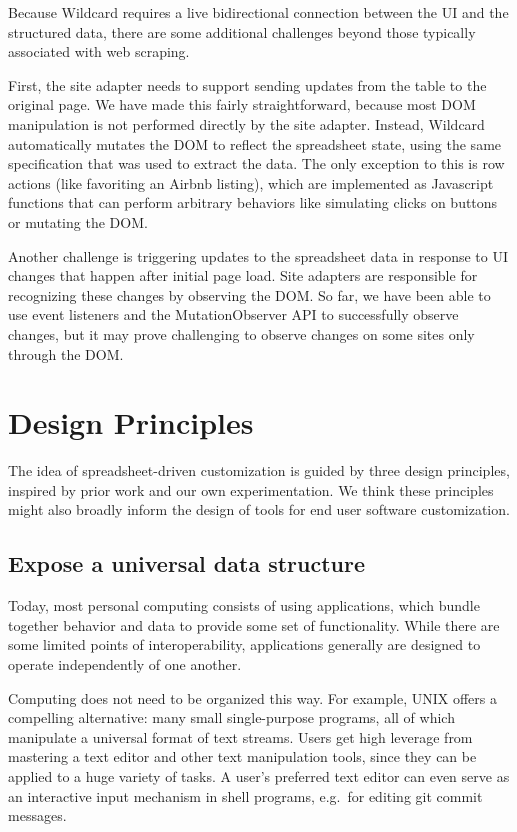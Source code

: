 \documentclass[english]{programming}
\begin{document}
Because Wildcard requires a live bidirectional connection between the UI
and the structured data, there are some additional challenges beyond
those typically associated with web scraping.

First, the site adapter needs to support sending updates from the table
to the original page. We have made this fairly straightforward, because
most DOM manipulation is not performed directly by the site adapter.
Instead, Wildcard automatically mutates the DOM to reflect the
spreadsheet state, using the same specification that was used to extract
the data. The only exception to this is row actions (like favoriting an
Airbnb listing), which are implemented as Javascript functions that can
perform arbitrary behaviors like simulating clicks on buttons or
mutating the DOM.

Another challenge is triggering updates to the spreadsheet data in
response to UI changes that happen after initial page load. Site
adapters are responsible for recognizing these changes by observing the
DOM. So far, we have been able to use event listeners and the
MutationObserver API to successfully observe changes, but it may prove
challenging to observe changes on some sites only through the DOM.

\hypertarget{sec:design-principles}{%
\section{Design Principles}\label{sec:design-principles}}

The idea of spreadsheet-driven customization is guided by three design
principles, inspired by prior work and our own experimentation. We think
these principles might also broadly inform the design of tools for end
user software customization.

\hypertarget{expose-a-universal-data-structure}{%
\subsection{Expose a universal data
structure}\label{expose-a-universal-data-structure}}

Today, most personal computing consists of using applications, which
bundle together behavior and data to provide some set of functionality.
While there are some limited points of interoperability, applications
generally are designed to operate independently of one another.

Computing does not need to be organized this way. For example, UNIX
offers a compelling alternative: many small single-purpose programs, all
of which manipulate a universal format of text streams. Users get high
leverage from mastering a text editor and other text manipulation tools,
since they can be applied to a huge variety of tasks. A user's preferred
text editor can even serve as an interactive input mechanism in shell
programs, e.g.~for editing git commit messages.
\end{document}
